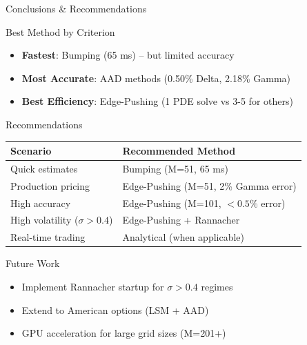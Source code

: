 \documentclass[aspectratio=169]{beamer}
\begin{document}
\begin{frame}{Conclusions \& Recommendations}

\begin{block}{Best Method by Criterion}
\begin{itemize}
    \item \textbf{Fastest}: Bumping (65 ms) -- but limited accuracy
    \item \textbf{Most Accurate}: AAD methods (0.50\% Delta, 2.18\% Gamma)
    \item \textbf{Best Efficiency}: Edge-Pushing (1 PDE solve vs 3-5 for others)
\end{itemize}
\end{block}

\vspace{0.5em}
\begin{block}{Recommendations}
\begin{tabular}{ll}
\toprule
\textbf{Scenario} & \textbf{Recommended Method} \\
\midrule
Quick estimates & Bumping (M=51, 65 ms) \\
Production pricing & Edge-Pushing (M=51, 2\% Gamma error) \\
High accuracy & Edge-Pushing (M=101, $<0.5\%$ error) \\
High volatility ($\sigma > 0.4$) & Edge-Pushing + Rannacher \\
Real-time trading & Analytical (when applicable) \\
\bottomrule
\end{tabular}
\end{block}

\vspace{0.5em}
\begin{block}{Future Work}
\begin{itemize}
    \item Implement Rannacher startup for $\sigma > 0.4$ regimes
    \item Extend to American options (LSM + AAD)
    \item GPU acceleration for large grid sizes (M=201+)
\end{itemize}
\end{block}

\end{frame}
\end{document}
